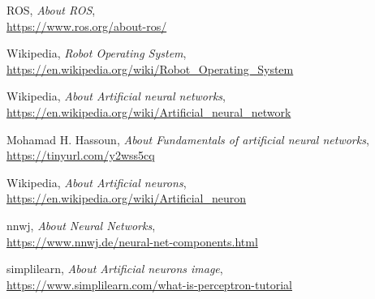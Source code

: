 \begin{thebibliography}{99}
 ROS,
\emph{About ROS},   \\
\url{https://www.ros.org/about-ros/}

 Wikipedia,
\emph{Robot Operating System},   \\
\url{https://en.wikipedia.org/wiki/Robot_Operating_System}

 Wikipedia,
\emph{About Artificial neural networks},   \\
\url{https://en.wikipedia.org/wiki/Artificial_neural_network}

 Mohamad H. Hassoun,
\emph{About Fundamentals of artificial neural networks},   \\
\url{https://tinyurl.com/y2wss5cq}

 Wikipedia,
\emph{About Artificial neurons},   \\
\url{https://en.wikipedia.org/wiki/Artificial_neuron}

 nnwj,
\emph{About Neural Networks},   \\
\url{https://www.nnwj.de/neural-net-components.html}


 simplilearn,
\emph{About Artificial neurons image},   \\
\url{https://www.simplilearn.com/what-is-perceptron-tutorial}

%

%

%

%

%

\end{thebibliography} 



